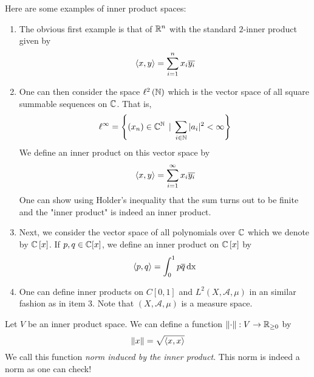 \begin{example}
    Here are some examples of inner product spaces:
    \begin{enumerate}
	\item The obvious first example is that of $\mathbb R ^{n}$ with the standard $2$-inner product given by
	    \begin{equation*}
		\left\langle x,y \right\rangle = \sum_{i=1}^{n} x_{i} \overline{y_{i}}
	    \end{equation*}

	\item One can then consider the space $\ell ^{2} \left( \mathbb N \right)$ which is the vector space of all square summable sequences on $\mathbb C$. That is,
	    \begin{equation*}
		\ell ^{\infty} = \left\{ \left( x_{n} \right) \in \mathbb C ^{\mathbb N} \, \mid \, \sum_{i\in \mathbb N} |a_i|^{2} < \infty \right\} \end{equation*}
We define an inner product on this vector space by 
 \begin{equation*}
		\left\langle x,y \right\rangle = \sum_{i=1}^{\infty} x_{i} \overline{y_{i}}
	    \end{equation*}
	    One can show using Holder's inequality that the sum turns out to be finite and the "inner product" is indeed an inner product.
	\item Next, we consider the vector space of all polynomials over $\mathbb C$ which we denote by $\mathbb C \left[ x \right]$. If $p , q \in \mathbb C [x]$, we define an inner product on $\mathbb C \left[ x \right]$ by 
	    \begin{equation*}
		\left\langle p,q \right\rangle = \int_{0}^{1} p\overline q \, \mathrm{dx}
	    \end{equation*}
	\item One can define inner products on $C[0,1]$ and $L^{2} (X, \mathscr A , \mu)$ in an similar fashion as in item 3. Note that $\left( X, \mathscr A, \mu \right)$ is a measure space.
    \end{enumerate}
\end{example}

\begin{definition}
    Let $V$ be an inner product space. We can define a function $\left\lVert \cdot \right\rVert : V \to \mathbb R _{\ge 0}$ by
    \begin{equation*}
	\left\lVert x \right\rVert = \sqrt{\left\langle x,x \right\rangle}
    \end{equation*}
    We call this function \textit{norm induced by the inner product}. This norm is indeed a norm as one can check!
    \label{def:norm-induced-by-ip}
\end{definition}
